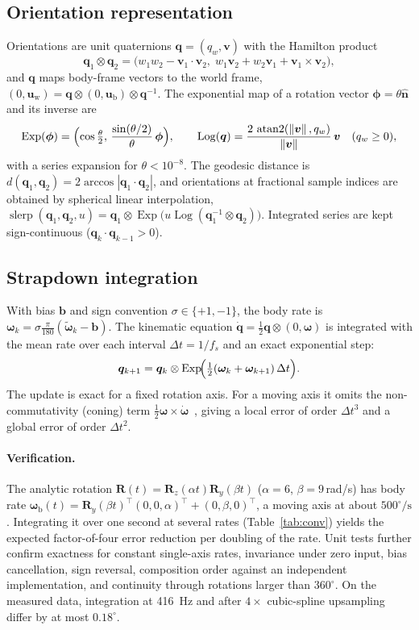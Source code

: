 \documentclass[11pt,a4paper]{article}
\newcommand{\q}{\bm{q}}
\newcommand{\qv}{\bm{v}}
\newcommand{\w}{\bm{\omega}}
\newcommand{\Rm}{\mathbf{R}}
\newcommand{\ve}[1]{\bm{#1}}
\newcommand{\qmul}{\otimes}
\newcommand{\dg}{^{\circ}}
\newcommand{\Exp}{\operatorname{Exp}}
\newcommand{\Log}{\operatorname{Log}}
\newcommand{\norm}[1]{\left\lVert #1 \right\rVert}
\begin{document}
\subsection{Orientation representation}\label{sec:quat}
Orientations are unit quaternions $\q=(q_w,\qv)$ with the Hamilton product
\begin{equation}
\q_1\qmul\q_2=\bigl(w_1w_2-\qv_1\!\cdot\!\qv_2,\; w_1\qv_2+w_2\qv_1+\qv_1\times\qv_2\bigr),
\end{equation}
and $\q$ maps body-frame vectors to the world frame,
$(0,\ve u_{\mathrm w})=\q\qmul(0,\ve u_{\mathrm b})\qmul\q^{-1}$. The exponential map of a rotation
vector $\ve\phi=\theta\hat{\ve n}$ and its inverse are~\cite{sola2017}
\begin{equation}
\Exp(\ve\phi)=\Bigl(\cos\tfrac{\theta}{2},\,\frac{\sin(\theta/2)}{\theta}\,\ve\phi\Bigr),\qquad
\Log(\q)=\frac{2\,\operatorname{atan2}(\norm{\qv},q_w)}{\norm{\qv}}\,\qv\quad(q_w\ge0),
\label{eq:exp}
\end{equation}
with a series expansion for $\theta<10^{-8}$. The geodesic distance is
$d(\q_1,\q_2)=2\arccos|\q_1\cdot\q_2|$, and orientations at fractional sample indices are obtained
by spherical linear interpolation,
$\operatorname{slerp}(\q_1,\q_2,u)=\q_1\qmul\Exp\bigl(u\Log(\q_1^{-1}\qmul\q_2)\bigr)$.
Integrated series are kept sign-continuous ($\q_k\cdot\q_{k-1}>0$).

\subsection{Strapdown integration}\label{sec:gyro}
With bias $\ve b$ and sign convention $\sigma\in\{+1,-1\}$, the body rate is
$\w_k=\sigma\frac{\pi}{180}(\tilde{\w}_k-\ve b)$. The kinematic equation
$\dot{\q}=\tfrac12\q\qmul(0,\w)$ is integrated with the mean rate over each interval
$\Delta t=1/f_s$ and an exact exponential step:
\begin{equation}
\q_{k+1}=\q_k\qmul\Exp\!\Bigl(\tfrac12(\w_k+\w_{k+1})\,\Delta t\Bigr).
\label{eq:integrate}
\end{equation}
The update is exact for a fixed rotation axis. For a moving axis it omits the non-commutativity
(coning) term $\tfrac12\w\times\dot{\w}$~\cite{bortz1971,savage1998}, giving a local error of
order $\Delta t^3$ and a global error of order $\Delta t^2$.

\paragraph{Verification.} The analytic rotation $\Rm(t)=\Rm_z(\alpha t)\Rm_y(\beta t)$
($\alpha=6$, $\beta=9$\,rad/s) has body rate
$\w_{\mathrm b}(t)=\Rm_y(\beta t)^{\top}(0,0,\alpha)^{\top}+(0,\beta,0)^{\top}$, a moving axis at
about $500\dg/\mathrm{s}$. Integrating it over one second at several rates
(Table~\ref{tab:conv}) yields the expected factor-of-four error reduction per doubling of the rate.
Unit tests further confirm exactness for constant single-axis rates, invariance under zero input,
bias cancellation, sign reversal, composition order against an independent implementation, and
continuity through rotations larger than $360\dg$. On the measured data, integration at
\SI{416}{Hz} and after $4\times$ cubic-spline upsampling differ by at most $0.18\dg$.
\end{document}
